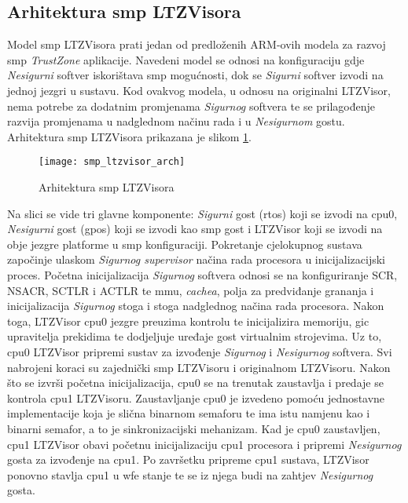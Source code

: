 \documentclass[times, utf8, diplomski, numeric]{fer}
\begin{document}
\subsection{Arhitektura \gls{smp} LTZVisora}
Model \gls{smp} LTZVisora prati jedan od predloženih ARM-ovih modela za razvoj \gls{smp} \textit{TrustZone} aplikacije. Navedeni model se
odnosi na konfiguraciju gdje \textit{Nesigurni} softver iskorištava \gls{smp} mogućnosti, dok se \textit{Sigurni} softver izvodi na
jednoj jezgri u sustavu. Kod ovakvog modela, u odnosu na originalni LTZVisor, nema potrebe za dodatnim promjenama
\textit{Sigurnog} softvera te se prilagođenje razvija promjenama u nadglednom načinu rada i u \textit{Nesigurnom} gostu.
Arhitektura \gls{smp} LTZVisora prikazana je slikom \ref{smp_ltzvisor}.
\begin{figure}[H]
  \centering
  \texttt{[image: smp\_ltzvisor\_arch]}
  \caption{Arhitektura \gls{smp} LTZVisora}
  \label{smp_ltzvisor}
\end{figure}
Na slici se vide tri glavne komponente: \textit{Sigurni} gost (\gls{rtos}) koji se izvodi na \gls{cpu}0, \textit{Nesigurni} gost (\gls{gpos})
koji se izvodi kao \gls{smp} gost i LTZVisor koji se izvodi na obje jezgre platforme u \gls{smp} konfiguraciji.
Pokretanje cjelokupnog sustava započinje ulaskom \textit{Sigurnog supervisor} načina rada procesora u inicijalizacijski proces.
Početna inicijalizacija \textit{Sigurnog} softvera odnosi se na konfiguriranje SCR, NSACR, SCTLR i ACTLR te \gls{mmu},
\textit{cachea}, polja za predviđanje grananja i inicijalizacija \textit{Sigurnog} stoga i stoga nadglednog načina rada
procesora. Nakon toga, LTZVisor \gls{cpu}0 jezgre preuzima kontrolu te inicijalizira memoriju, \gls{gic} upravitelja prekidima te
dodjeljuje uređaje gost virtualnim strojevima. Uz to, \gls{cpu}0 LTZVisor pripremi sustav za izvođenje \textit{Sigurnog} i
\textit{Nesigurnog} softvera. Svi nabrojeni koraci su zajednički \gls{smp} LTZVisoru i originalnom LTZVisoru. Nakon što se izvrši
početna inicijalizacija, \gls{cpu}0 se na trenutak zaustavlja i predaje se kontrola \gls{cpu}1 LTZVisoru. Zaustavljanje \gls{cpu}0 je izvedeno
pomoću jednostavne implementacije koja je slična binarnom semaforu te ima istu namjenu kao i binarni semafor, a to je
sinkronizacijski mehanizam. Kad je \gls{cpu}0 zaustavljen, \gls{cpu}1 LTZVisor obavi početnu inicijalizaciju \gls{cpu}1 procesora i pripremi
\textit{Nesigurnog} gosta za izvođenje na \gls{cpu}1. Po završetku pripreme \gls{cpu}1 sustava, LTZVisor ponovno stavlja \gls{cpu}1 u \gls{wfe} stanje
te se iz njega budi na zahtjev \textit{Nesigurnog} gosta.
\end{document}
